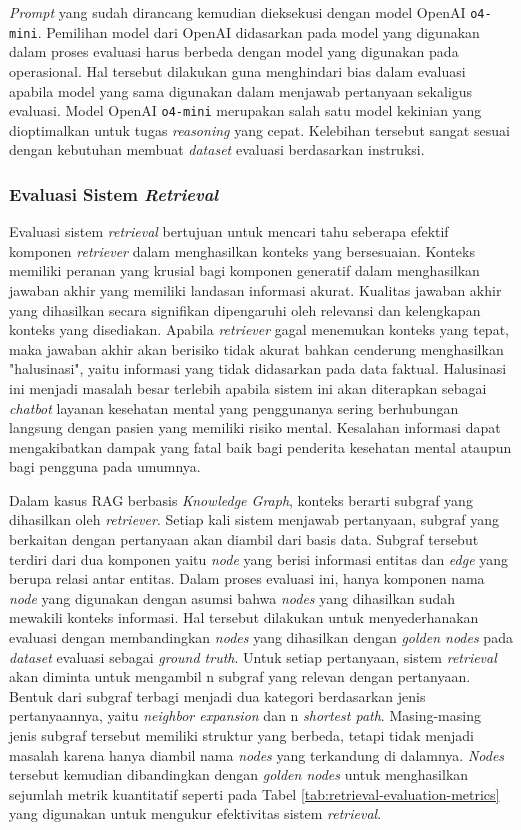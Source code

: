 \textit{Prompt} yang sudah dirancang kemudian dieksekusi dengan model OpenAI \texttt{o4-mini}.
Pemilihan model dari OpenAI didasarkan pada model yang digunakan dalam proses evaluasi harus berbeda dengan model yang digunakan pada operasional.
Hal tersebut dilakukan guna menghindari bias dalam evaluasi apabila model yang sama digunakan dalam menjawab pertanyaan sekaligus evaluasi.
Model OpenAI \texttt{o4-mini} merupakan salah satu model kekinian yang dioptimalkan untuk tugas \textit{reasoning} yang cepat.
Kelebihan tersebut sangat sesuai dengan kebutuhan membuat \textit{dataset} evaluasi berdasarkan instruksi.

\subsubsection{Evaluasi Sistem \textit{Retrieval}}
Evaluasi sistem \textit{retrieval} bertujuan untuk mencari tahu seberapa efektif komponen \textit{retriever} dalam menghasilkan konteks yang bersesuaian.
Konteks memiliki peranan yang krusial bagi komponen generatif dalam menghasilkan jawaban akhir yang memiliki landasan informasi akurat.
Kualitas jawaban akhir yang dihasilkan secara signifikan dipengaruhi oleh relevansi dan kelengkapan konteks yang disediakan.
Apabila \textit{retriever} gagal menemukan konteks yang tepat, maka jawaban akhir akan berisiko tidak akurat bahkan cenderung menghasilkan "halusinasi", yaitu informasi yang tidak didasarkan pada data faktual.
Halusinasi ini menjadi masalah besar terlebih apabila sistem ini akan diterapkan sebagai \textit{chatbot} layanan kesehatan mental yang penggunanya sering berhubungan langsung dengan pasien yang memiliki risiko mental.
Kesalahan informasi dapat mengakibatkan dampak yang fatal baik bagi penderita kesehatan mental ataupun bagi pengguna pada umumnya.

Dalam kasus RAG berbasis \textit{Knowledge Graph}, konteks berarti subgraf yang dihasilkan oleh \textit{retriever}.
Setiap kali sistem menjawab pertanyaan, subgraf yang berkaitan dengan pertanyaan akan diambil dari basis data.
Subgraf tersebut terdiri dari dua komponen yaitu \textit{node} yang berisi informasi entitas dan \textit{edge} yang berupa relasi antar entitas.
Dalam proses evaluasi ini, hanya komponen nama  \textit{node} yang digunakan dengan asumsi bahwa \textit{nodes} yang dihasilkan sudah mewakili konteks informasi.
Hal tersebut dilakukan untuk menyederhanakan evaluasi dengan membandingkan \textit{nodes} yang dihasilkan dengan \textit{golden nodes} pada \textit{dataset} evaluasi sebagai \textit{ground truth}.
Untuk setiap pertanyaan, sistem \textit{retrieval} akan diminta untuk mengambil n subgraf yang relevan dengan pertanyaan.
Bentuk dari subgraf terbagi menjadi dua kategori berdasarkan jenis pertanyaannya, yaitu \textit{neighbor expansion} dan n \textit{shortest path}.
Masing-masing jenis subgraf tersebut memiliki struktur yang berbeda, tetapi tidak menjadi masalah karena hanya diambil nama \textit{nodes} yang terkandung di dalamnya.
\textit{Nodes} tersebut kemudian dibandingkan dengan \textit{golden nodes} untuk menghasilkan sejumlah metrik kuantitatif seperti pada Tabel \ref{tab:retrieval-evaluation-metrics} yang digunakan untuk mengukur efektivitas sistem \textit{retrieval}.


